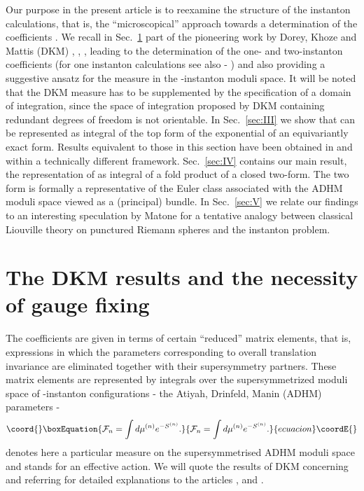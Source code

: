 \documentclass[a4paper,12pt]{article}
\begin{document}
Our purpose in the present article is to reexamine the structure of 
the instanton calculations, that is, the ``microscopical'' approach 
towards a determination of the coefficients \coordHE{}. 
We recall in Sec.~\ref{sec:II} part of the pioneering work by Dorey, 
Khoze and Mattis (DKM) \cite{dorey1}, \cite{dorey2}, \cite{dorey3}, 
leading to the determination of the one- and two-instanton 
coefficients \cite{dorey1} (for one instanton calculations see 
also \cite{finnel} - \cite{yung}) and also providing a suggestive ansatz
for the measure in the \coordHE{}-instanton moduli space\cite{dorey3}. It 
will be noted that the DKM measure has to be supplemented by the 
specification of a domain of integration, since the space of 
integration proposed by DKM containing redundant degrees of 
freedom is not orientable. In Sec.~\ref{sec:III} we show that \coordHE{} 
can be represented as integral 
of the top form of the exponential of an 
equivariantly exact form. Results equivalent to those in 
this section have been obtained in \cite{tanzini1} and \cite{tanzini2} within 
a technically different framework. Sec.~\ref{sec:IV} contains our main 
result, the representation of \coordHE{} as integral of a 
\coordHE{} fold product of a closed two-form. The two form is formally 
a representative of the Euler class associated with the ADHM moduli 
space viewed as a (principal) \coordHE{} bundle. 
In Sec.~\ref{sec:V} we relate our findings to an interesting 
speculation by Matone \cite{matone1} for a tentative analogy 
between classical Liouville theory on punctured Riemann spheres 
and the \coordHE{} instanton problem. 

\section{The DKM results and the necessity of \coordHE{} gauge 
fixing}\label{sec:II}
 
The coefficients \coordHE{} are given in terms of certain ``reduced'' 
matrix elements, that is, expressions in which the parameters 
corresponding to overall translation invariance are eliminated 
together with their supersymmetry partners. These matrix 
elements are represented by integrals over the supersymmetrized 
moduli space of \coordHE{}-instanton configurations - the Atiyah, Drinfeld, 
Manin (ADHM) \cite{adhm} parameters - 
\begin{equation}\coord{}\boxEquation{
{\cal F}_n=\int d\mu^{(n)}e^{-S^{(n)}}.
\label{modspaceint}
}{
{\cal F}_n=\int d\mu^{(n)}e^{-S^{(n)}}.
}{ecuacion}\coordE{}\end{equation}
\coordHE{} denotes here a particular measure on the \coordHE{} 
supersymmetrised ADHM moduli space and \coordHE{} stands for an 
effective \coordHE{} action. We will quote the results of 
DKM concerning \coordHE{} and \coordHE{} referring for detailed 
explanations to the articles \cite{dorey1}, \cite{dorey2} and  
\cite{dorey3}. 
\end{document}
